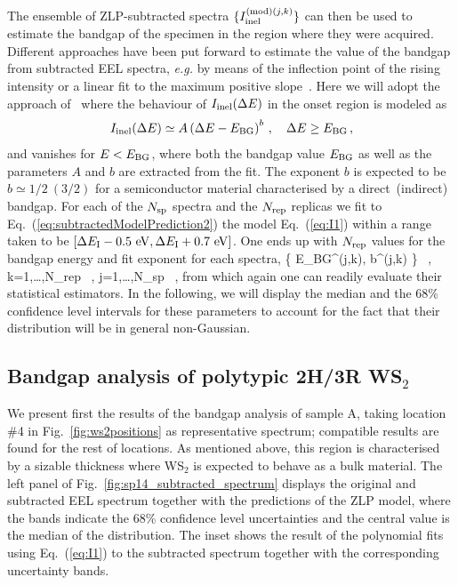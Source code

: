  The ensemble of ZLP-subtracted spectra $\{I_{\rm inel}^{({\rm mod})(j,k)} \} $
 can then be used to estimate the bandgap of the specimen in the region where
 they were acquired.
 Different approaches  have been put forward to estimate the value of the bandgap from 
subtracted EEL spectra, \textit{e.g.} by means of the inflection point of the rising intensity or
a linear fit to the maximum positive slope~\cite{Schamm:2003}.
%
Here we will adopt the approach of~\cite{Rafferty:2000} where the behaviour
of $I_{\rm inel}(\Delta E)$ in the onset region is modeled as
\begin{equation}
  \label{eq:I1}
    I_{\rm inel}(\Delta E) \simeq  A \left( \Delta E-E_{\rm BG} \right)^{b} \, , \quad \Delta E \ge E_{\rm BG} \, ,
\end{equation}
and vanishes for $E < E_{\rm BG}$, where both the bandgap value
$E_{\rm BG}$ as well as the parameters $A$ and $b$ are extracted from the fit.
%
The exponent $b$ is expected to be $b\simeq 1/2~(3/2)$ for a semiconductor material characterised
by a direct~(indirect) bandgap.
 For each of the $N_{\rm sp}$ spectra and the $N_{\rm rep}$ replicas
 we fit to Eq.~(\ref{eq:subtractedModelPrediction2}) the model Eq.~(\ref{eq:I1})
 within a range taken to be
 $\left[ \Delta E_{\rm I} - 0.5~{\rm eV}, \Delta E_{\rm I} + 0.7~{\rm eV}\right]$.
 One ends up with $N_{\rm rep}$ values for
 the bandgap energy and fit exponent for each spectra,
 \be
 \Big \{ E_{\rm BG}^{(j,k)}, b^{(j,k)} \Big\} \, , \quad k=1,\ldots,N_{\rm rep} \, ,
 \quad j=1,\ldots,N_{\rm sp} \, ,
 \ee
 from which again one can readily evaluate their statistical estimators.
 In the following, we will display the median and the 68\% confidence level intervals
 for these parameters to account for the fact that their distribution will be in general non-Gaussian.

 \subsection{Bandgap analysis of polytypic 2H/3R WS$_2$}

We present first the results of the bandgap analysis of sample A,
taking location \#4 in Fig.~\ref{fig:ws2positions} as representative spectrum; compatible results
are found for the rest of locations.
%
As mentioned above, this region is characterised by a sizable thickness where
WS$_2$ is expected to behave as a bulk material.
%
The left panel of Fig.~\ref{fig:sp14_subtracted_spectrum} displays the original
and subtracted EEL spectrum
together with the predictions of the ZLP model, where
the bands indicate the 68\% confidence level uncertainties and the central value
is the median of the distribution.
%
The inset shows the result of the polynomial fits using Eq.~(\ref{eq:I1}) to the subtracted spectrum
together with the corresponding uncertainty bands.

